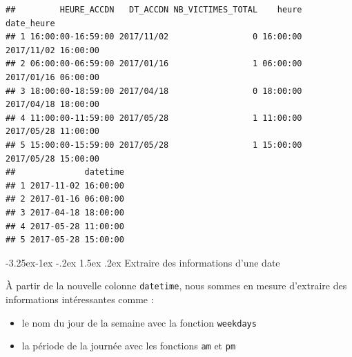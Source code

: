 \documentclass[
  11pt,
  french,
]{book}
\makeatletter
\newenvironment{Shaded}{\begin{snugshade}}{\end{snugshade}}
\newcommand{\DataTypeTok}[1]{\textcolor[rgb]{0.13,0.29,0.53}{#1}}
\newcommand{\DecValTok}[1]{\textcolor[rgb]{0.00,0.00,0.81}{#1}}
\newcommand{\KeywordTok}[1]{\textcolor[rgb]{0.13,0.29,0.53}{\textbf{#1}}}
\newcommand{\NormalTok}[1]{#1}
\newcommand{\OperatorTok}[1]{\textcolor[rgb]{0.81,0.36,0.00}{\textbf{#1}}}
\newcommand{\StringTok}[1]{\textcolor[rgb]{0.31,0.60,0.02}{#1}}
\providecommand{\tightlist}{%
  \setlength{\itemsep}{0pt}\setlength{\parskip}{0pt}}
\newenvironment{kframe}{%
\medskip{}
\setlength{\fboxsep}{.8em}
 \def\at@end@of@kframe{}%
 \ifinner\ifhmode%
  \def\at@end@of@kframe{\end{minipage}}%
  \begin{minipage}{\columnwidth}%
 \fi\fi%
 \def\FrameCommand##1{\hskip\@totalleftmargin \hskip-\fboxsep
 \colorbox{shadecolor}{##1}\hskip-\fboxsep
     \hskip-\linewidth \hskip-\@totalleftmargin \hskip\columnwidth}%
 \MakeFramed {\advance\hsize-\width
   \@totalleftmargin\z@ \linewidth\hsize
   \@setminipage}}%
 {\par\unskip\endMakeFramed%
 \at@end@of@kframe}
\renewenvironment{Shaded}{\begin{kframe}}{\end{kframe}}
\renewcommand\paragraph{\@startsection{paragraph}{4}{\z@}%
   {-3.25ex\@plus -1ex \@minus -.2ex}%
   {1.5ex \@plus .2ex}%
   {\normalfont\normalsize\bfseries}}
\makeatother
\begin{document}
\begin{verbatim}
##         HEURE_ACCDN   DT_ACCDN NB_VICTIMES_TOTAL    heure          date_heure
## 1 16:00:00-16:59:00 2017/11/02                 0 16:00:00 2017/11/02 16:00:00
## 2 06:00:00-06:59:00 2017/01/16                 1 06:00:00 2017/01/16 06:00:00
## 3 18:00:00-18:59:00 2017/04/18                 0 18:00:00 2017/04/18 18:00:00
## 4 11:00:00-11:59:00 2017/05/28                 1 11:00:00 2017/05/28 11:00:00
## 5 15:00:00-15:59:00 2017/05/28                 1 15:00:00 2017/05/28 15:00:00
##              datetime
## 1 2017-11-02 16:00:00
## 2 2017-01-16 06:00:00
## 3 2017-04-18 18:00:00
## 4 2017-05-28 11:00:00
## 5 2017-05-28 15:00:00
\end{verbatim}

\hypertarget{sect014262}{%
\paragraph{Extraire des informations d'une date}\label{sect014262}}

À partir de la nouvelle colonne \texttt{datetime}, nous sommes en mesure d'extraire des informations intéressantes comme :

\begin{itemize}
\tightlist
\item
  le nom du jour de la semaine avec la fonction \texttt{weekdays}
\end{itemize}

\begin{Shaded}
\end{Shaded}

\begin{itemize}
\tightlist
\item
  la période de la journée avec les fonctions \texttt{am} et \texttt{pm}
\end{itemize}

\begin{Shaded}
\end{Shaded}
\end{document}
